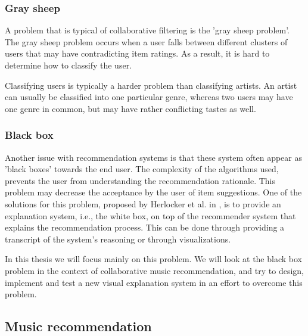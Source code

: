 \subsubsection{Gray sheep}

A problem that is typical of collaborative filtering is the 'gray sheep problem'\cite{burke:2002, herlocker:2000}. The gray sheep problem occurs when a user falls between different clusters of users that may have contradicting item ratings. As a result, it is hard to determine how to classify the user\cite{burke:2002}.

Classifying users is typically a harder problem than classifying artists. An artist can usually be classified into one particular genre, whereas two users may have one genre in common, but may have rather conflicting tastes as well\cite{rajaraman:2012}.



\subsubsection{Black box}

Another issue with recommendation systems is that these system often appear as 'black boxes' towards the end user. The complexity of the algorithms used, prevents the user from understanding the recommendation rationale\cite{zhao:2010}. This problem may decrease the acceptance by the user of item suggestions. One of the solutions for this problem, proposed by Herlocker et al. in \cite{herlocker:2000}, is to provide an explanation system, i.e., the white box, on top of the recommender system that explains the recommendation process. This can be done through providing a transcript of the system's reasoning or through visualizations\cite{herlocker:2000}.

In this thesis we will focus mainly on this problem. We will look at the black box problem in the context of collaborative music recommendation, and try to design, implement and test a new visual explanation system in an effort to overcome this problem.


\subsection{Music recommendation}\label{chapter:literature_study:section:computer:subsection:music}

